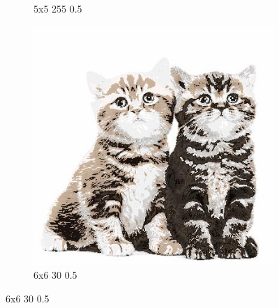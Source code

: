 \documentclass[12pt,a4paper]{article}
\begin{document}
\begin{figure}[htb]
\begin{subfigure}{0.25\textwidth}
  \caption{5x5 255 0.5}
  \label{fig:5}
\end{subfigure}
\begin{subfigure}{0.25\textwidth}
  \includegraphics[width=\linewidth]{images/big/6-6-30-05}
  \caption{6x6 30 0.5}
  \label{fig:6}
\end{subfigure}\hfil %


\end{figure}
\end{document}
